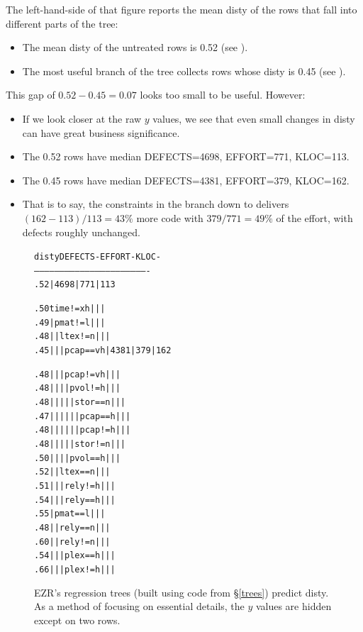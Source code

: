 \documentclass[AMA,STIX2COL]{WileyNJDv5}
\newcommand{\disc}[2][black]{%
  \tikz[baseline=(c.base)]%
    \node[circle, fill=#1, draw=#1,
          inner sep=0pt, minimum size=1.2ex,
          text=white, font=\tiny\bfseries]
    (c) {#2};%
}
\newcommand{\rc}[1]{%
  \iftoggle{rcred}{\disc[red]{#1}}{\disc[black]{#1}}%
}
\begin{document}
The left-hand-side of that figure
reports the mean \textsf{disty} of
the rows that fall into different  parts of the tree:
\begin{itemize}
\item
The mean \textsf{disty} of the
untreated rows is 0.52 (see \rc{1}). 
\item The most useful branch of the tree
collects rows whose \textsf{disty} is 0.45
(see \rc{2}).
\end{itemize}
This gap of $0.52-0.45 = 0.07$ looks too
small to be useful. However:
\begin{itemize}
\item
If we look closer at the raw $y$ values,
we see that   even small
changes in \textsf{disty}
can have great business significance.
\item
The
0.52 rows have median DEFECTS=4698, EFFORT=771, KLOC=113.
\item The
0.45 rows have median DEFECTS=4381, EFFORT=379, KLOC=162.
\item That is to say,
the constraints  in the branch down to 
\rc{2}  delivers $(162-113)/113 = 43\%$ more code with
$379/771 = 49\%$ of the effort, with defects roughly unchanged.
 \end{itemize}
\begin{figure}[!t]
{\fontsize{6pt}{7.2pt}\selectfont
\begin{alltt}
disty                                  DEFECTS-   EFFORT-   KLOC- 
-------------------------------------------------------------------
.52                                |    4698  |    771  |  113 \rc{1}
.50    time != xh                  |          |         |
.49    |  pmat != l                |          |         |
.48    |  |  ltex != n             |          |         |
.45    |  |  |  pcap == vh         |    4381  |    379  |  162 \rc{2}
.48    |  |  |  pcap != vh         |          |         |
.48    |  |  |  |  pvol != h       |          |         |
.48    |  |  |  |  |  stor == n    |          |         |
.47    |  |  |  |  |  |  pcap == h |          |         |
.48    |  |  |  |  |  |  pcap != h |          |         |
.48    |  |  |  |  |  stor != n    |          |         |
.50    |  |  |  |  pvol == h       |          |         |
.52    |  |  ltex == n             |          |         |
.51    |  |  |  rely != h          |          |         |
.54    |  |  |  rely == h          |          |         |
.55    |  pmat == l                |          |         |
.48    |  |  rely == n             |          |         |
.60    |  |  rely != n             |          |         |
.54    |  |  |  plex == h          |          |         |
.66    |  |  |  plex != h          |          |         |
\end{alltt}
}
\caption{EZR's regression trees (built using
code from \S\ref{trees}) predict \textsf{disty}.
As a method of focusing on essential details, the  $y$ values
are hidden except on two rows.}\label{htree}
\end{figure}
\end{document}
